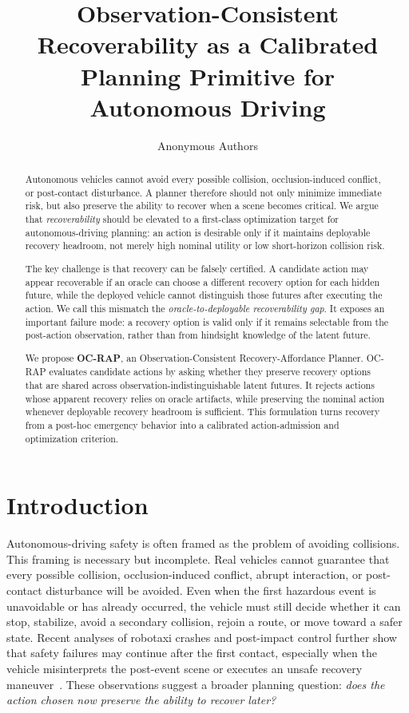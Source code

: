 \documentclass[conference]{IEEEtran}
\title{Observation-Consistent Recoverability as a Calibrated Planning Primitive for Autonomous Driving}
\author{Anonymous Authors}
\begin{document}
\maketitle


\begin{abstract}
Autonomous vehicles cannot avoid every possible collision, occlusion-induced conflict, or post-contact disturbance.  A planner therefore should not only minimize immediate risk, but also preserve the ability to recover when a scene becomes critical.  We argue that \emph{recoverability} should be elevated to a first-class optimization target for autonomous-driving planning: an action is desirable only if it maintains deployable recovery headroom, not merely high nominal utility or low short-horizon collision risk.

The key challenge is that recovery can be falsely certified.  A candidate action may appear recoverable if an oracle can choose a different recovery option for each hidden future, while the deployed vehicle cannot distinguish those futures after executing the action.  We call this mismatch the \emph{oracle-to-deployable recoverability gap}.  It exposes an important failure mode: a recovery option is valid only if it remains selectable from the post-action observation, rather than from hindsight knowledge of the latent future.

We propose \textbf{OC-RAP}, an Observation-Consistent Recovery-Affordance Planner.  OC-RAP evaluates candidate actions by asking whether they preserve recovery options that are shared across observation-indistinguishable latent futures.  It rejects actions whose apparent recovery relies on oracle artifacts, while preserving the nominal action whenever deployable recovery headroom is sufficient.  This formulation turns recovery from a post-hoc emergency behavior into a calibrated action-admission and optimization criterion.  
\end{abstract}


\section{Introduction}
\label{sec:introduction}

Autonomous-driving safety is often framed as the problem of avoiding collisions.  This framing is necessary but incomplete.  Real vehicles cannot guarantee that every possible collision, occlusion-induced conflict, abrupt interaction, or post-contact disturbance will be avoided.  Even when the first hazardous event is unavoidable or has already occurred, the vehicle must still decide whether it can stop, stabilize, avoid a secondary collision, rejoin a route, or move toward a safer state.  Recent analyses of robotaxi crashes and post-impact control further show that safety failures may continue after the first contact, especially when the vehicle misinterprets the post-event scene or executes an unsafe recovery maneuver~\cite{koopman2024anatomy,yang2025post,ghosh2026post,wang2024post}.  These observations suggest a broader planning question: \emph{does the action chosen now preserve the ability to recover later?}
\end{document}
